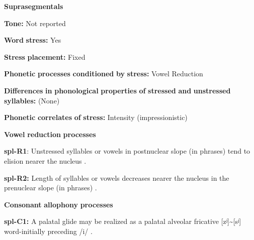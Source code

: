 \documentclass[output=paper]{langsci/langscibook}
\begin{document}
\begin{styleBody}
\textbf{Suprasegmentals}
\end{styleBody}

\begin{styleBody}
\textbf{Tone:} Not reported
\end{styleBody}

\begin{styleBody}
\textbf{Word} \textbf{stress:} Yes
\end{styleBody}

\begin{styleBody}
\textbf{Stress} \textbf{placement:} Fixed
\end{styleBody}

\begin{styleBody}
\textbf{Phonetic} \textbf{processes} \textbf{conditioned} \textbf{by} \textbf{stress:} Vowel Reduction
\end{styleBody}

\begin{styleBody}
\textbf{Differences} \textbf{in} \textbf{phonological} \textbf{properties} \textbf{of} \textbf{stressed} \textbf{and} \textbf{unstressed} \textbf{syllables:} (None)
\end{styleBody}

\begin{styleBody}
\textbf{Phonetic} \textbf{correlates} \textbf{of} \textbf{stress:} Intensity (impressionistic)
\end{styleBody}

\begin{styleBody}
\textbf{Vowel} \textbf{reduction} \textbf{processes}
\end{styleBody}

\begin{styleBody}
\textbf{spl-R1}: Unstressed syllables or vowels in postnuclear slope (in phrases) tend to elision nearer the nucleus \citep[6]{McElhanon1970}.
\end{styleBody}

\begin{styleBody}
\textbf{spl-R2:} Length of syllables or vowels decreases nearer the nucleus in the prenuclear slope (in phrases) \citep[6]{McElhanon1970}.
\end{styleBody}

\begin{styleBody}
\textbf{Consonant} \textbf{allophony} \textbf{processes}
\end{styleBody}

\begin{styleBody}
\textbf{spl-C1:} A palatal glide may be realized as a palatal alveolar fricative [zʲ]{\textasciitilde}[sʲ] word-initially preceding /i/ \citep{McElhanon1970}.
\end{styleBody}
\end{document}
